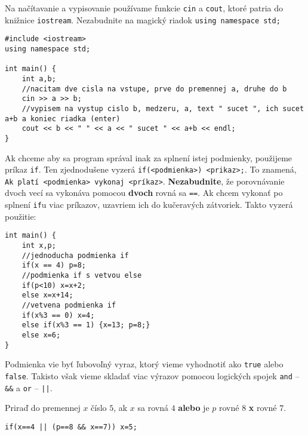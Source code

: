 
Na načítavanie a vypisovanie používame funkcie \texttt{cin} a \texttt{cout}, ktoré patria do
knižnice \texttt{iostream}. Nezabudnite na magický riadok \texttt{using namespace std;}

\begin{lstlisting}
#include <iostream>
using namespace std;

int main() {
    int a,b;
    //nacitam dve cisla na vstupe, prve do premennej a, druhe do b
    cin >> a >> b;
    //vypisem na vystup cislo b, medzeru, a, text " sucet ", ich sucet a+b a koniec riadka (enter)
    cout << b << " " << a << " sucet " << a+b << endl;
}
\end{lstlisting}


Ak chceme aby sa program správal inak za splnení istej podmienky, použijeme príkaz \texttt{if}. Ten
zjednodušene vyzerá \texttt{if(<podmienka>) <prikaz>;}. To znamená, \texttt{Ak platí <podmienka>
vykonaj <príkaz>}. \textbf{Nezabudnite}, že porovnávanie dvoch vecí sa vykonáva pomocou \textbf{dvoch}
rovná sa \texttt{==}. Ak chcem vykonať po splnení \texttt{if}u viac príkazov, uzavriem ich do
kučeravých zátvoriek. Takto vyzerá použitie:

\begin{lstlisting}
int main() {
    int x,p;
    //jednoducha podmienka if
    if(x == 4) p=8;
    //podmienka if s vetvou else
    if(p<10) x=x+2;
    else x=x+14;
    //vetvena podmienka if
    if(x%3 == 0) x=4;
    else if(x%3 == 1) {x=13; p=8;}
    else x=6;
}
\end{lstlisting}

Podmienka vie byť ľubovoľný vyraz, ktorý vieme vyhodnotiť ako \texttt{true} alebo \texttt{false}.
Takisto však vieme skladať viac výrazov pomocou logických spojek \texttt{and} -- \texttt{\&\&} a
\texttt{or} -- \texttt{||}.

Priraď do premennej $x$ číslo $5$, ak $x$ sa rovná $4$ \textbf{alebo} je $p$ rovné $8$ \textbf{x}
rovné $7$.
\begin{lstlisting}
if(x==4 || (p==8 && x==7)) x=5;
\end{lstlisting}


